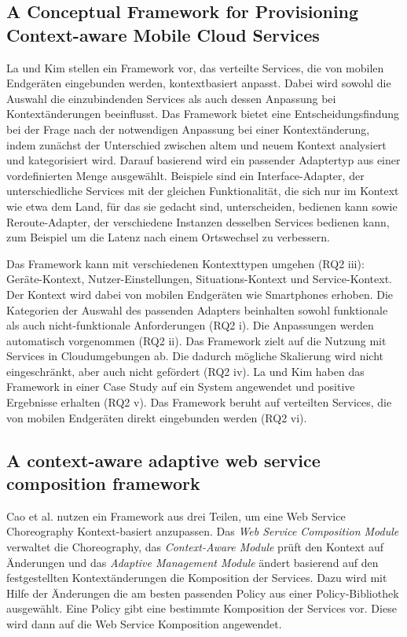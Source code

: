 \documentclass[conference,compsoc]{IEEEtran}
\begin{document}
\subsection{A Conceptual Framework for Provisioning Context-aware Mobile Cloud Services}
La und Kim \cite{LK10} stellen ein Framework vor, das verteilte Services, die von mobilen Endgeräten eingebunden werden, kontextbasiert anpasst. Dabei wird sowohl die Auswahl die einzubindenden Services als auch dessen Anpassung bei Kontextänderungen beeinflusst. Das Framework bietet eine Entscheidungsfindung bei der Frage nach der notwendigen Anpassung bei einer Kontextänderung, indem zunächst der Unterschied zwischen altem und neuem Kontext analysiert und kategorisiert wird. Darauf basierend wird ein passender Adaptertyp aus einer vordefinierten Menge ausgewählt. Beispiele sind ein Interface-Adapter, der unterschiedliche Services mit der gleichen Funktionalität, die sich nur im Kontext wie etwa dem Land, für das sie gedacht sind, unterscheiden, bedienen kann sowie Reroute-Adapter, der verschiedene Instanzen desselben Services bedienen kann, zum Beispiel um die Latenz nach einem Ortswechsel zu verbessern.

Das Framework kann mit verschiedenen Kontexttypen umgehen (RQ2 iii): Geräte-Kontext, Nutzer-Einstellungen, Situations-Kontext und Service-Kontext. Der Kontext wird dabei von mobilen Endgeräten wie Smartphones erhoben. Die Kategorien der Auswahl des passenden Adapters beinhalten sowohl funktionale als auch nicht-funktionale Anforderungen (RQ2 i). Die Anpassungen werden automatisch vorgenommen (RQ2 ii). Das Framework zielt auf die Nutzung mit Services in Cloudumgebungen ab. Die dadurch mögliche Skalierung wird nicht eingeschränkt, aber auch nicht gefördert (RQ2 iv). La und Kim \cite{LK10} haben das Framework in einer Case Study auf ein System angewendet und positive Ergebnisse erhalten (RQ2 v). Das Framework beruht auf verteilten Services, die von mobilen Endgeräten direkt eingebunden werden (RQ2 vi).

\subsection{A context-aware adaptive web service composition framework}
Cao et al. \cite{CZZ15} nutzen ein Framework aus drei Teilen, um eine Web Service Choreography Kontext-basiert anzupassen. Das \textit{Web Service Composition Module} verwaltet die Choreography, das \textit{Context-Aware Module} prüft den Kontext auf Änderungen und das \textit{Adaptive Management Module} ändert basierend auf den festgestellten Kontextänderungen die Komposition der Services. Dazu wird mit Hilfe der Änderungen die am besten passenden Policy aus einer Policy-Bibliothek ausgewählt. Eine Policy gibt eine bestimmte Komposition der Services vor. Diese wird dann auf die Web Service Komposition angewendet.
\end{document}
